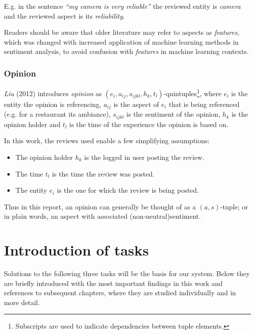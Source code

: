 \documentclass[a4paper,11pt]{kth-mag}
\begin{document}
E.g. in the sentence \emph{``my camera is very reliable''} the reviewed entity is \emph{camera} and the reviewed aspect is its \emph{reliability}.

Readers should be aware that older literature may refer to aspects as \emph{features}, which was changed with increased application of machine learning methods in sentiment analysis, to avoid confusion with \emph{features} in machine learning contexts.

\vspace{1cm}

\subsubsection{Opinion}
\emph{Liu} (2012) introduces \emph{opinion} as $(e_i,a_{ij},s_{ijkl},h_k,t_l)$-quintuples\footnote{Subscripts are
  used to indicate dependencies between tuple elements.},
where $e_i$ is the entity the opinion is referencing,
$a_{ij}$ is the aspect of $e_i$ that is being referenced (e.g. for a restaurant its ambiance),
$s_{ijkl}$ is the sentiment of the opinion,
$h_k$ is the opinion holder and
$t_l$ is the time of the experience the opinion is based on\cite[Chapter~2.1]{liu2012sentiment}.

In this work, the reviews used enable a few simplifying assumptions:
\begin{itemize}
\item The opinion holder $h_k$ is the logged in user posting the review.
\item The time $t_l$ is the time the review was posted.
\item The entity $e_i$ is the one for which the review is being posted.
\end{itemize}

Thus in this report, an opinion can generally be thought of as a $(a,s)$-tuple; or in plain words, an aspect with associated (non-neutral)sentiment.
\vspace{4cm}

\pagebreak

\section{Introduction of tasks}
Solutions to the following three tasks will be the basis for our system.
Below they are briefly introduced with the most important findings in this work and references
to subsequent chapters, where they are studied individually and in more detail.
\end{document}

